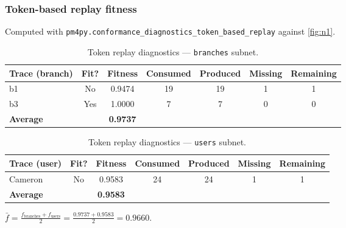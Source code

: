 \documentclass[11pt,a4paper]{article}
\newcommand{\otBranches}{\texttt{branches}}
\newcommand{\otUsers}{\texttt{users}}
\begin{document}
\subsubsection*{Token-based replay fitness}

Computed with \texttt{pm4py.conformance\_diagnostics\_token\_based\_replay}
against \cref{fig:n1}.

\begin{table}[H]
      \centering\small
      \caption{Token replay diagnostics — \otBranches{} subnet.}
      \label{tab:replay-branches}
      \begin{tabular}{@{}lcccccc@{}}
            \toprule
            \textbf{Trace (branch)} & \textbf{Fit?}     & \textbf{Fitness} &
            \textbf{Consumed}       & \textbf{Produced} & \textbf{Missing} & \textbf{Remaining}              \\
            \midrule
            b1                      & No                & 0.9474           & 19                 & 19 & 1 & 1 \\
            b3                      & Yes               & 1.0000           & 7                  & 7  & 0 & 0 \\
            \midrule
            \textbf{Average}        &                   & \textbf{0.9737}  &                    &    &   &   \\
            \bottomrule
      \end{tabular}
\end{table}

\begin{table}[H]
      \centering\small
      \caption{Token replay diagnostics — \otUsers{} subnet.}
      \label{tab:replay-users}
      \begin{tabular}{@{}lcccccc@{}}
            \toprule
            \textbf{Trace (user)} & \textbf{Fit?}     & \textbf{Fitness} &
            \textbf{Consumed}     & \textbf{Produced} & \textbf{Missing} & \textbf{Remaining}              \\
            \midrule
            Cameron               & No                & 0.9583           & 24                 & 24 & 1 & 1 \\
            \midrule
            \textbf{Average}      &                   & \textbf{0.9583}  &                    &    &   &   \\
            \bottomrule
      \end{tabular}
\end{table}

$\bar{f} = \frac{f_{\text{branches}} + f_{\text{users}}}{2}
      = \frac{0.9737 + 0.9583}{2} = 0.9660$.
\end{document}
